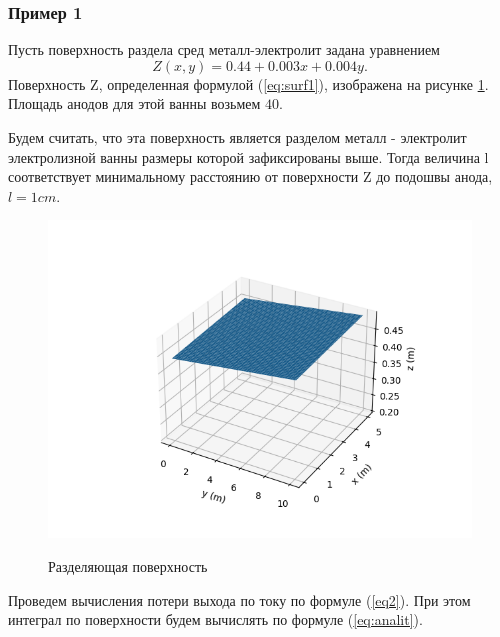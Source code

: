 \documentclass{article}
\begin{document}
\subsubsection*{Пример 1}\label{ex1m}
Пусть поверхность раздела сред металл-электролит задана уравнением
\begin{equation} \label{eq:surf1}
Z(x,y) = 0.44 + 0.003x + 0.004y.
\end{equation}
Поверхность Z, определенная формулой (\ref{eq:surf1}), изображена на рисунке \ref{fig:H1Surf}. Площадь анодов для этой ванны возьмем $40$.

Будем считать, что эта поверхность является разделом металл - электролит электролизной ванны размеры которой зафиксированы выше. Тогда величина l соответствует минимальному расстоянию от поверхности Z до подошвы анода, $l=1 cm$.

\begin{figure}[H]
\centering
\includegraphics[width=0.8\linewidth]{First_surface.png}
\caption{}
\label{fig:H1Surf}
Разделяющая поверхность
\end{figure}

Проведем вычисления потери выхода по току по формуле (\ref{eq2}). При этом интеграл по поверхности будем вычислять по формуле (\ref{eq:analit}).
\end{document}
